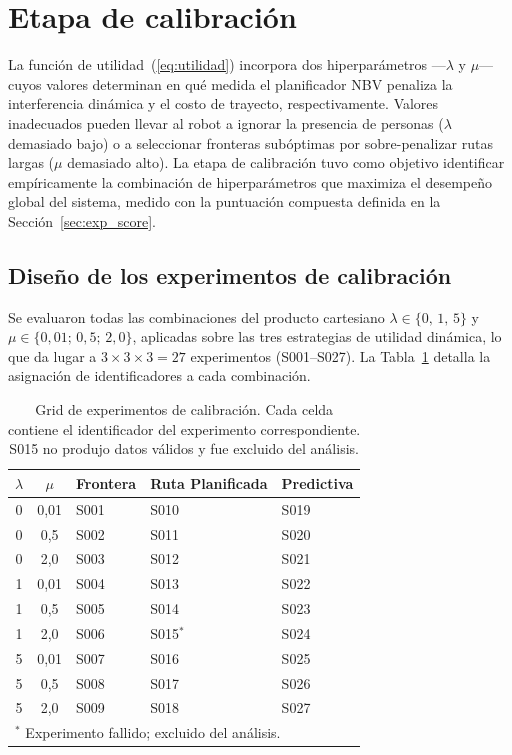 \section{Etapa de calibración}%
\label{sec:exp_calibracion}

La función de utilidad~(\ref{eq:utilidad}) incorpora dos hiperparámetros ---$\lambda$ y $\mu$--- cuyos valores determinan en qué medida el planificador NBV penaliza la interferencia dinámica y el costo de trayecto, respectivamente. Valores inadecuados pueden llevar al robot a ignorar la presencia de personas ($\lambda$ demasiado bajo) o a seleccionar fronteras subóptimas por sobre-penalizar rutas largas ($\mu$ demasiado alto). La etapa de calibración tuvo como objetivo identificar empíricamente la combinación de hiperparámetros que maximiza el desempeño global del sistema, medido con la puntuación compuesta definida en la Sección~\ref{sec:exp_score}.

\subsection{Diseño de los experimentos de calibración}

Se evaluaron todas las combinaciones del producto cartesiano $\lambda \in \{0,\, 1,\, 5\}$ y $\mu \in \{0{,}01;\, 0{,}5;\, 2{,}0\}$, aplicadas sobre las tres estrategias de utilidad dinámica, lo que da lugar a $3 \times 3 \times 3 = 27$ experimentos (S001--S027). La Tabla~\ref{tab:cal_grid} detalla la asignación de identificadores a cada combinación.

\begin{table}[htbp]
    \centering
    \caption{Grid de experimentos de calibración. Cada celda contiene el identificador del experimento correspondiente. S015 no produjo datos válidos y fue excluido del análisis.}%
    \label{tab:cal_grid}
    \begin{tabular}{cclll}
        \toprule
        $\lambda$ & $\mu$ & \textbf{Frontera} & \textbf{Ruta Planificada} & \textbf{Predictiva} \\
        \midrule
        0 & 0,01 & S001 & S010 & S019 \\
        0 & 0,5  & S002 & S011 & S020 \\
        0 & 2,0  & S003 & S012 & S021 \\
        1 & 0,01 & S004 & S013 & S022 \\
        1 & 0,5  & S005 & S014 & S023 \\
        1 & 2,0  & S006 & S015$^{*}$ & S024 \\
        5 & 0,01 & S007 & S016 & S025 \\
        5 & 0,5  & S008 & S017 & S026 \\
        5 & 2,0  & S009 & S018 & S027 \\
        \bottomrule
        \multicolumn{5}{l}{\footnotesize $^{*}$ Experimento fallido; excluido del análisis.}
    \end{tabular}
\end{table}

